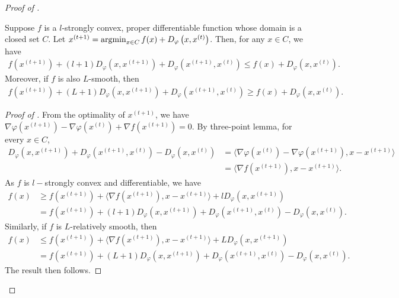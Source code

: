 \begin{proof}[Proof of ]
\begin{lemma}
    \label{lemma:bregman-minimizer-property}
    Suppose $f$ is a $l$-strongly convex, proper differentiable function whose domain is a closed set
    $C$. Let $ x^{(t+1)} = \operatorname*{argmin}_{x \in C} f(x) + D_{\varphi}\left(x, x^{(t)} \right)$.
    Then, for any $x \in C$, we have
    \begin{align*}
        f(x^{(t+1)}) + (l+1) D_{\varphi}(x, x^{(t+1)}) + D_{\varphi} (x^{(t+1)}, x^{(t)})
        \leq f(x) + D_{\varphi} (x, x^{(t)}).
    \end{align*}
    Moreover, if $f$ is also $L$-smooth, then
    \begin{align*}
            f(x^{(t+1)}) + (L+1) D_{\varphi}(x, x^{(t+1)}) + D_{\varphi} (x^{(t+1)}, x^{(t)})
            \geq f(x) + D_{\varphi} (x, x^{(t)}).
        \end{align*}
\end{lemma}
\begin{proof}[Proof of ]
    From the optimality of $x^{(t+1)}$, we have
    $\nabla \varphi(x^{(t+1)}) - \nabla \varphi(x^{(t)}) + \nabla f(x^{(t+1)}) = 0$.
    By three-point lemma, for every $x \in C$,
    \begin{align*}
        D_{\varphi}(x, x^{(t+1)}) + D_{\varphi} (x^{(t+1)}, x^{(t)}) - D_{\varphi} (x, x^{(t)}) &= \langle \nabla \varphi(x^{(t)}) - \nabla \varphi(x^{(t+1)}), x - x^{(t+1)} \rangle \\
        &= \langle \nabla f(x^{(t+1)}), x - x^{(t+1)} \rangle.
    \end{align*}
    As $f$ is $l-$strongly convex and differentiable, we have
    \begin{align*}
        f(x) &\geq f(x^{(t+1)}) + \langle \nabla f(x^{(t+1)}), x -
                x^{(t+1)} \rangle  + l D_{\varphi}(x, x^{(t+1)})\\
        &=         f(x^{(t+1)}) + (l+1) D_{\varphi}(x, x^{(t+1)})
        + D_{\varphi} (x^{(t+1)}, x^{(t)}) - D_{\varphi} (x, x^{(t)}).
    \end{align*}
    Similarly, if $f$ is $L$-relatively smooth, then
    \begin{align*}
        f(x) &\leq f(x^{(t+1)}) + \langle \nabla f(x^{(t+1)}), x -
                x^{(t+1)} \rangle  + L D_{\varphi}(x, x^{(t+1)})\\
        &=         f(x^{(t+1)}) + (L+1) D_{\varphi}(x, x^{(t+1)})
        + D_{\varphi} (x^{(t+1)}, x^{(t)}) - D_{\varphi} (x, x^{(t)}).
    \end{align*}
    The result then follows.
\end{proof}


\end{proof}
